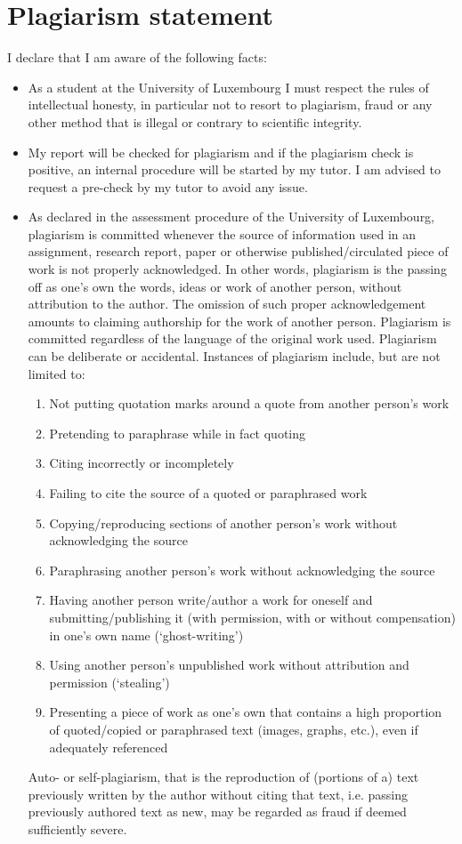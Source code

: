 \documentclass[conference,compsoc]{IEEEtran}
\begin{document}
\section{Plagiarism statement}

\newline
I declare that I am aware of the following facts:
\begin{itemize}
	\item As a student at the University of Luxembourg I must respect the rules of intellectual honesty, in particular not to resort to plagiarism, fraud or any other method that is illegal or contrary to scientific integrity.
	\item My report will be checked for plagiarism and if the plagiarism check is positive, an internal procedure will be started by my tutor. I am advised to request a pre-check by my tutor to avoid any issue.
	\item As declared in the assessment procedure of the University of Luxembourg, plagiarism is committed whenever the source of information used in an assignment, research report, paper or otherwise published/circulated piece of work is not properly acknowledged. In other words, plagiarism is the passing off as one’s own the words, ideas or work of another person, without attribution to the author. The omission of such proper acknowledgement amounts to claiming authorship for the work of another person. Plagiarism is committed regardless of the language of the original work used. Plagiarism can be deliberate or accidental.
Instances of plagiarism include, but are not limited to:
\begin{enumerate}
  \item Not putting quotation marks around a quote from another person’s work
  \item Pretending to paraphrase while in fact quoting
  \item Citing incorrectly or incompletely
  \item Failing to cite the source of a quoted or paraphrased work
  \item Copying/reproducing sections of another person’s work without acknowledging the source
  \item Paraphrasing another person’s work without acknowledging the source
  \item Having another person write/author a work for oneself and submitting/publishing it (with permission, with or without compensation) in one’s own name (‘ghost-writing’)
  \item Using another person’s unpublished work without attribution and permission (‘stealing’)
  \item Presenting a piece of work as one’s own that contains a high proportion of quoted/copied or paraphrased text (images, graphs, etc.), even if adequately referenced
\end{enumerate}
Auto- or self-plagiarism, that is the reproduction of (portions of a) text previously written by the author without citing that text, i.e. passing previously authored text as new, may be regarded as fraud if deemed sufficiently severe.
\end{itemize}
\end{document}
